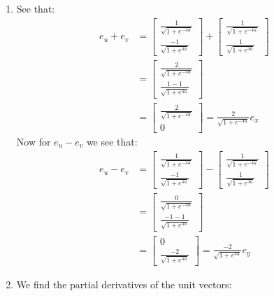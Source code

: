 \documentclass[a4paper, 11pt]{article}
\begin{document}
\begin{enumerate}[label=(\alph*)]
  \item See that:
        \begin{align*}
          e_u +e_v & =
          \begin{bmatrix}
            \frac{1}{\sqrt{1 + e^{-4u}}} \\
            \frac{-1}{\sqrt{1 + e^{4u}}}
          \end{bmatrix}
          +\begin{bmatrix}
             \frac{1}{\sqrt{1 + e^{-4u}}} \\
             \frac{1}{\sqrt{1 + e^{4u}}}
           \end{bmatrix}                           \\
                   & =\begin{bmatrix}
                        \frac{2}{\sqrt{1 + e^{-4u}}} \\
                        \frac{1-1}{\sqrt{1 + e^{4u}}}
                      \end{bmatrix}               \\
                   & =\begin{bmatrix}
                        \frac{2}{\sqrt{1 + e^{-4u}}} \\
                        0
                      \end{bmatrix} = \frac{2}{\sqrt{1 + e^{-4u}}}e_x
        \end{align*}
        Now for $e_u-e_v$ we see that:
        \begin{align*}
          e_u -e_v & =
          \begin{bmatrix}
            \frac{1}{\sqrt{1 + e^{-4u}}} \\
            \frac{-1}{\sqrt{1 + e^{4u}}}
          \end{bmatrix}
          -\begin{bmatrix}
             \frac{1}{\sqrt{1 + e^{-4u}}} \\
             \frac{1}{\sqrt{1 + e^{4u}}}
           \end{bmatrix}                           \\
                   & =\begin{bmatrix}
                        \frac{0}{\sqrt{1 + e^{-4u}}} \\
                        \frac{-1-1}{\sqrt{1 + e^{4u}}}
                      \end{bmatrix}              \\
                   & =\begin{bmatrix}
                        0 \\\frac{-2}{\sqrt{1 + e^{4u}}}
                      \end{bmatrix} = \frac{-2}{\sqrt{1 + e^{4u}}}e_y
        \end{align*}
  \item We find the partial derivatives of the unit vectors:



\end{enumerate}
\end{document}
